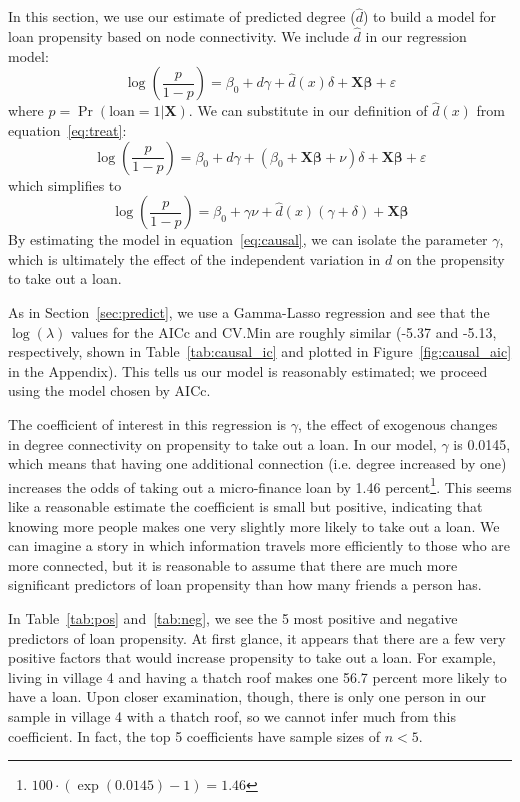 \documentclass[11pt, fleqn]{article}
\begin{document}
In this section, we use our estimate of predicted degree ($\hat{d}$) to build a model for loan propensity based on node connectivity. We include $\hat{d}$ in our regression model:
\begin{equation} \label{eq:causal}
\log\left(\frac{p}{1-p}\right) = \beta_0 + d \gamma + \hat{d}(x) \delta + \bm{X}\bm{\beta} + \varepsilon
\end{equation}
where $p = \Pr(\text{loan}=1|\bm{X})$. We can substitute in our definition of $\hat{d}(x)$ from equation~\ref{eq:treat}:
\begin{equation}
\log\left(\frac{p}{1-p}\right) = \beta_0 + d \gamma + \left(\beta_0 + \bm{X} \bm{\beta} + \nu\right) \delta + \bm{X}\bm{\beta} + \varepsilon
\end{equation}
which simplifies to
\begin{equation}
\log\left(\frac{p}{1-p}\right) = \beta_0 + \gamma \nu + \hat{d}(x) (\gamma + \delta) + \bm{X}\bm{\beta}
\end{equation}
By estimating the model in equation~\ref{eq:causal}, we can isolate the parameter $\gamma$, which is ultimately the effect of the independent variation in $d$ on the propensity to take out a loan. 

As in Section~\ref{sec:predict}, we use a Gamma-Lasso regression and see that the $\log(\lambda)$ values for the AICc and CV.Min are roughly similar (-5.37 and -5.13, respectively, shown in Table~\ref{tab:causal_ic} and plotted in Figure~\ref{fig:causal_aic} in the Appendix). This tells us our model is reasonably estimated; we proceed using the model chosen by AICc.

The coefficient of interest in this regression is $\gamma$, the effect of exogenous changes in degree connectivity on propensity to take out a loan. In our model, $\gamma$ is 0.0145, which means that having one additional connection (i.e. degree increased by one) increases the odds of taking out a micro-finance loan by 1.46 percent\footnote{$100 \cdot \left( \exp(0.0145) - 1 \right) = 1.46$}. This seems like a reasonable estimate \textemdash the coefficient is small but positive, indicating that knowing more people makes one very slightly more likely to take out a loan. We can imagine a story in which information travels more efficiently to those who are more connected, but it is reasonable to assume that there are much more significant predictors of loan propensity than how many friends a person has.

In Table~\ref{tab:pos} and~\ref{tab:neg}, we see the 5 most positive and negative predictors of loan propensity. At first glance, it appears that there are a few very positive factors that would increase propensity to take out a loan. For example, living in village 4 and having a thatch roof makes one 56.7 percent more likely to have a loan. Upon closer examination, though, there is only one person in our sample in village 4 with a thatch roof, so we cannot infer much from this coefficient. In fact, the top 5 coefficients have sample sizes of $n<5$.
\end{document}
